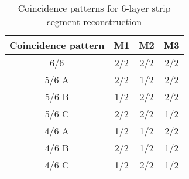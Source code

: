 \begin{table}[htbp]
\centering
\small
\caption{Coincidence patterns for 6-layer strip segment reconstruction}
\label{tab:strip_coin}
\begin{tabular}{c|ccc}
\hline
\textbf{Coincidence pattern} & \textbf{M1} & \textbf{M2} & \textbf{M3} \\
\hline
6/6       & 2/2 & 2/2 & 2/2 \\
5/6 A     & 2/2 & 1/2 & 2/2 \\
5/6 B     & 1/2 & 2/2 & 2/2 \\
5/6 C     & 2/2 & 2/2 & 1/2 \\
4/6 A     & 1/2 & 1/2 & 2/2 \\
4/6 B     & 2/2 & 1/2 & 1/2 \\
4/6 C     & 1/2 & 2/2 & 1/2 \\
\hline
\end{tabular}
\end{table}